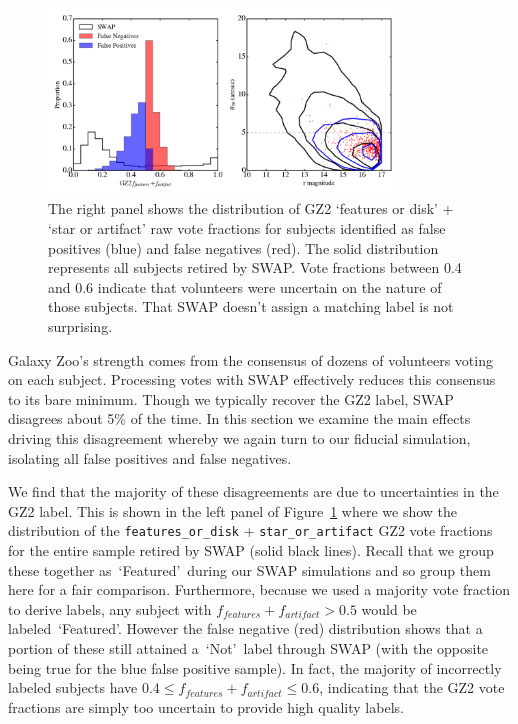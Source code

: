 \documentclass[twocolumn]{aastex6}
\newcommand{\feat}{`Featured'}
\newcommand{\notfeat}{`Not'}
\begin{document}
\begin{figure}[t!]
\includegraphics[width=3.65in]{figures/swapgetsitwrong_test.png}
\caption{The right panel shows the distribution of GZ2 `features or disk' + `star or artifact'  raw vote fractions for subjects identified as false positives (blue) and false negatives (red). The solid distribution represents all subjects retired by SWAP. Vote fractions between 0.4 and 0.6 indicate that volunteers were uncertain on the nature of those subjects.  That SWAP doesn't assign a matching label is not surprising.  \label{fig: SWAP sucks}}
\end{figure}

Galaxy Zoo's strength comes from the consensus of dozens of volunteers voting on each subject. 
Processing votes with SWAP effectively reduces this consensus to its bare minimum. 
Though we typically recover the GZ2 label, SWAP disagrees about 5\% of the time. 
In this section we examine the main effects driving this disagreement whereby we again
 turn to our fiducial simulation, isolating all false positives and false negatives. 

We find that the majority of these disagreements are due to uncertainties in the GZ2
label. This is shown in the left panel of Figure~\ref{fig: SWAP sucks} where we show
the distribution of the \texttt{features\_or\_disk} + \texttt{star\_or\_artifact} GZ2 vote 
fractions for the entire sample retired by SWAP (solid black lines). 
Recall that we group these together as~\feat~during  our SWAP simulations and so 
group them here for a fair comparison. Furthermore, because we used a majority vote
fraction to derive labels, any subject with $ f_{features}+f_{artifact} > 0.5$ would be
labeled~\feat.  However the false negative (red) distribution shows that a portion 
of these still attained a~\notfeat~label through SWAP (with the opposite being 
true for the blue false positive sample). In fact, the majority of incorrectly labeled 
subjects have $0.4 \le f_{features}+f_{artifact} \le 0.6$,
indicating that the GZ2 vote fractions are simply too uncertain to provide high quality labels. 
\end{document}
